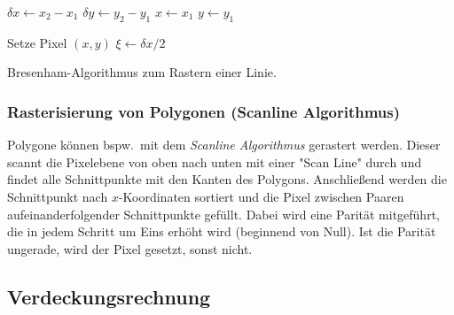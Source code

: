 \documentclass[a4paper, 11pt, accentcolor = tud3b]{tudreport}
\newcommand{\bspw}{bspw.~}
\begin{document}
					\begin{algorithm}
						\DontPrintSemicolon
						
						
						\( \delta x \gets x_2 - x_1 \)\;
						\( \delta y \gets y_2 - y_1 \) \;
						\( x \gets x_1 \) \;
						\( y \gets y_1 \) \;
						
						
						Setze Pixel \( (x, y) \) \;
						\( \xi \gets \delta x / 2 \) \;
						
					
						\caption{Bresenham-Algorithmus zum Rastern einer Linie.}
						\label{alg:bresenham}
					\end{algorithm}
	
				\subsubsection{Rasterisierung von Polygonen (Scanline Algorithmus)}
					Polygone können \bspw mit dem \emph{Scanline Algorithmus} gerastert werden. Dieser scannt die Pixelebene von oben nach unten mit einer "Scan Line" durch und findet alle Schnittpunkte mit den Kanten des Polygons. Anschließend werden die Schnittpunkt nach \(x\)-Koordinaten sortiert und die Pixel zwischen Paaren aufeinanderfolgender Schnittpunkte gefüllt. Dabei wird eine Parität mitgeführt, die in jedem Schritt um Eins erhöht wird (beginnend von Null). Ist die Parität ungerade, wird der Pixel gesetzt, sonst nicht.

			\subsection{Verdeckungsrechnung}
\end{document}
